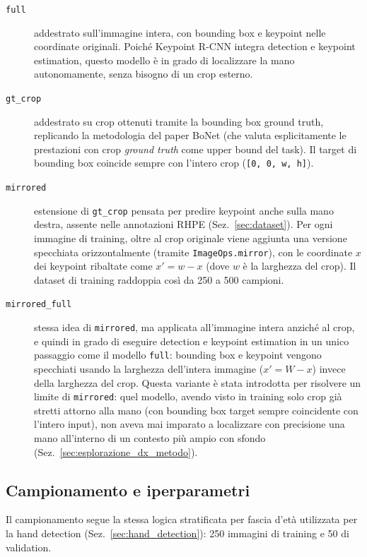 \begin{description}
    \item[\texttt{full}] addestrato sull'immagine intera, con bounding box
    e keypoint nelle coordinate originali. Poiché Keypoint R-CNN integra
    detection e keypoint estimation, questo modello è in grado di
    localizzare la mano autonomamente, senza bisogno di un crop esterno.

    \item[\texttt{gt\_crop}] addestrato su crop ottenuti tramite la
    bounding box ground truth, replicando la metodologia del paper BoNet
    (che valuta esplicitamente le prestazioni con crop \emph{ground
    truth} come upper bound del task). Il target di bounding box
    coincide sempre con l'intero crop (\texttt{[0, 0, w, h]}).

    \item[\texttt{mirrored}] estensione di \texttt{gt\_crop} pensata per
    predire keypoint anche sulla mano destra, assente nelle annotazioni
    RHPE (Sez.~\ref{sec:dataset}). Per ogni
    immagine di training, oltre al crop originale viene aggiunta una
    versione specchiata orizzontalmente (tramite \texttt{ImageOps.mirror}),
    con le coordinate $x$ dei keypoint ribaltate come $x' = w - x$
    (dove $w$ è la larghezza del crop). Il dataset di training raddoppia
    così da 250 a 500 campioni.

    \item[\texttt{mirrored\_full}] stessa idea di \texttt{mirrored}, ma
    applicata all'immagine intera anziché al crop, e quindi in grado di
    eseguire detection e keypoint estimation in un unico passaggio come
    il modello \texttt{full}: bounding box e keypoint vengono specchiati
    usando la larghezza dell'intera immagine
    ($x' = W - x$) invece della larghezza del crop. Questa variante è
    stata introdotta per risolvere un limite di \texttt{mirrored}: quel
    modello, avendo visto in training solo crop già stretti attorno alla
    mano (con bounding box target sempre coincidente con l'intero
    input), non aveva mai imparato a localizzare con precisione una mano
    all'interno di un contesto più ampio con sfondo (Sez.~\ref{sec:esplorazione_dx_metodo}).
\end{description}

\subsection{Campionamento e iperparametri}

Il campionamento segue la stessa logica stratificata per fascia d'età
utilizzata per la hand detection (Sez.~\ref{sec:hand_detection}): 250
immagini di training e 50 di validation.

